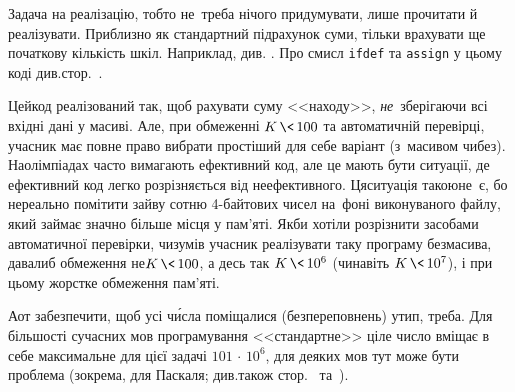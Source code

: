 \Tutorial	Задача на реалізацію, тобто не~треба нічого придумувати, лише прочитати й реалізувати. Приблизно як стандартний підрахунок суми, тільки врахувати ще початкову кількість шкіл. Наприклад, див. \nolinebreak\hspace{0.125em}.
Про смисл \texttt{ifdef} та \texttt{assign} у цьому коді див.\nolinebreak[2] стор.~\pageref{text:FAQ-ifdef-short-example}. 

Цей\nolinebreak[2] код реалізований так, щоб рахувати суму <<на\nolinebreak[2] ходу>>, \emph{не}~зберігаючи всі вхідні дані у масиві. Але, при обмеженні ${K\,{\<}\,100}$ та автоматичній перевірці, учасник має повне право вибрати простіший для себе варіант (з~масивом чи\nolinebreak[3] без). На\nolinebreak[3] олімпіадах часто вимагають ефективний код, але це мають бути ситуації, де ефективний код легко розрізняється від неефективного. Ця\nolinebreak[3] ситуація такою\nolinebreak[2] не~є, бо нереально помітити зайву сотню \mbox{4-}\nolinebreak[3]байто\-вих чисел на~фоні виконуваного файлу, який займає значно більше місця у пам'яті. Якби хотіли розрізнити засобами автоматичної перевірки, чи\nolinebreak[2] зумів учасник реалізувати таку програму без\nolinebreak[2] масива, давали\nolinebreak[3] б обмеження не\nolinebreak[3] ${K\,{\<}\,100}$, а десь так ${K\,{\<}\,10^6}$ (чи\nolinebreak[2] навіть ${K\,{\<}\,10^7}$), і при цьому жорстке обмеження пам'яті.

А\nolinebreak[3] от забезпечити, щоб усі ч\'{и}сла поміщалися (без\nolinebreak[3] переповнень) у\nolinebreak[3] тип, треба. Для більшості сучасних мов програмування <<стандартне>> ціле число вміщає в себе максимальне для цієї задачі ${101\,{\cdot}\,10^6}$, для деяких мов тут може бути проблема (зокрема, для Паскаля; див.\nolinebreak[2] також стор.~\pageref{text:overflow-example} та~\pageref{text:notes-about-delphi-mode}).